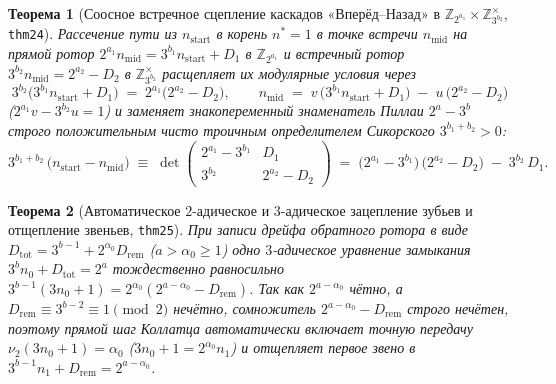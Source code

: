\documentclass[11pt,a4paper]{article}
\newtheorem{theorem}{Теорема}[section]
\theoremstyle{definition}
\theoremstyle{remark}
\begin{document}
\begin{theorem}[Соосное встречное сцепление каскадов «Вперёд–Назад» в $\mathbb{Z}_{2^{a_1}} \times \mathbb{Z}_{3^{b_2}}^\times$, \texttt{thm24}]
\label{thm:counter-rotating-splice}
Рассечение пути из $n_{\mathrm{start}}$ в корень $n^* = 1$ в точке встречи $n_{\mathrm{mid}}$ на прямой ротор $2^{a_1} n_{\mathrm{mid}} = 3^{b_1} n_{\mathrm{start}} + D_1$ в $\mathbb{Z}_{2^{a_1}}$ и встречный ротор $3^{b_2} n_{\mathrm{mid}} = 2^{a_2} - D_2$ в $\mathbb{Z}_{3^{b_2}}^\times$ расщепляет их модулярные условия через
\begin{equation}
  \label{eq:counter-rotating-splice}
  3^{b_2}\bigl(3^{b_1} n_{\mathrm{start}} + D_1\bigr) \;=\; 2^{a_1}\bigl(2^{a_2} - D_2\bigr), \qquad
  n_{\mathrm{mid}} \;=\; v\,\bigl(3^{b_1} n_{\mathrm{start}} + D_1\bigr) \;-\; u\,\bigl(2^{a_2} - D_2\bigr)
\end{equation}
($2^{a_1} v - 3^{b_2} u = 1$) и заменяет знакопеременный знаменатель Пиллаи $2^a - 3^b$ строго положительным чисто троичным определителем Сикорского $3^{b_1 + b_2} > 0$:
\begin{equation}
  \label{eq:pure-ternary-chord-law}
  3^{b_1 + b_2}\,\bigl(n_{\mathrm{start}} - n_{\mathrm{mid}}\bigr) \;\equiv\; \det\begin{pmatrix} 2^{a_1} - 3^{b_1} & D_1 \\ 3^{b_2} & 2^{a_2} - D_2 \end{pmatrix} \;=\; \bigl(2^{a_1} - 3^{b_1}\bigr)\,\bigl(2^{a_2} - D_2\bigr) \;-\; 3^{b_2}\,D_1.
\end{equation}
\end{theorem}

\begin{theorem}[Автоматическое $2$-адическое и $3$-адическое зацепление зубьев и отщепление звеньев, \texttt{thm25}]
\label{thm:gear-tooth-meshing}
При записи дрейфа обратного ротора в виде $D_{\mathrm{tot}} = 3^{b-1} + 2^{\alpha_0} D_{\mathrm{rem}}$ ($a > \alpha_0 \ge 1$) одно $3$-адическое уравнение замыкания $3^b n_0 + D_{\mathrm{tot}} = 2^a$ тождественно равносильно $3^{b-1}(3 n_0 + 1) = 2^{\alpha_0}(2^{a - \alpha_0} - D_{\mathrm{rem}})$. Так как $2^{a - \alpha_0}$ чётно, а $D_{\mathrm{rem}} \equiv 3^{b-2} \equiv 1 \pmod 2$ нечётно, сомножитель $2^{a - \alpha_0} - D_{\mathrm{rem}}$ строго нечётен, поэтому прямой шаг Коллатца автоматически включает точную передачу $\nu_2(3 n_0 + 1) = \alpha_0$ ($3 n_0 + 1 = 2^{\alpha_0} n_1$) и отщепляет первое звено в $3^{b-1} n_1 + D_{\mathrm{rem}} = 2^{a - \alpha_0}$.
\end{theorem}
\end{document}
